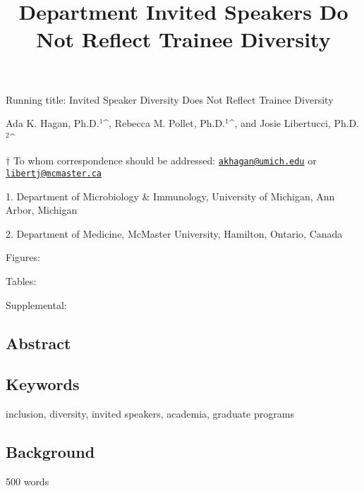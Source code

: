 \documentclass[10pt,]{article}
\title{\textbf{Department Invited Speakers Do Not Reflect Trainee Diversity}}
\author{}
\date{}
\begin{document}
\maketitle

\vspace{30mm}

Running title: Invited Speaker Diversity Does Not Reflect Trainee
Diversity

\vspace{35mm}

Ada K. Hagan, Ph.D.\({^1}\)\^{}, Rebecca M. Pollet, Ph.D.\({^1}\)\^{},
and Josie Libertucci, Ph.D.\({^2}\)\^{}

\vspace{35mm}

\(\dagger\) To whom correspondence should be addressed:
\href{mailto:akhagan@umich.edu}{\nolinkurl{akhagan@umich.edu}} or
\href{mailto:libertj@mcmaster.ca}{\nolinkurl{libertj@mcmaster.ca}}

1. Department of Microbiology \& Immunology, University of Michigan, Ann
Arbor, Michigan

2. Department of Medicine, McMaster University, Hamilton, Ontario,
Canada

Figures:

Tables:

Supplemental:

\newpage

\linenumbers

\subsection{Abstract}\label{abstract}

\subsection{Keywords}\label{keywords}

inclusion, diversity, invited speakers, academia, graduate programs

\newpage

\subsection{Background}\label{background}

500 words
\end{document}
